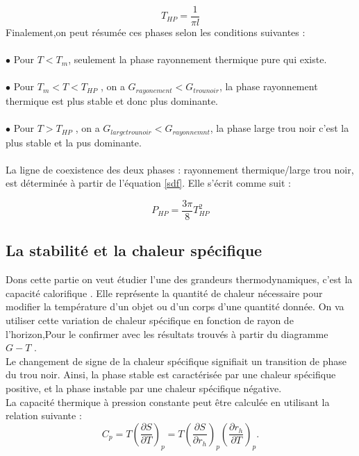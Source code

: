 \documentclass[12pt,  a4paper, openright]{report} %
\begin{document}
\begin{equation}
\label{sdf}
T_{HP}=\dfrac{1}{\pi l}
\end{equation}
Finalement,on peut résumée ces phases selon les conditions suivantes :\\
\\
$\bullet$  Pour $T < T_{m}$, seulement la phase rayonnement thermique pure qui existe.\\
\\
$\bullet$ Pour $ T_{m} < T < T_{HP}$ , on a $ G_{rayonement} < G_{trou noir}$, la phase rayonnement thermique est plus stable et donc plus dominante.\\
\\
$\bullet$ Pour $T > T_{HP}$ , on a $G_{large trou noir} < G_{rayonnemnt}$, la phase large trou noir c’est la plus stable et la pus dominante.\\
\\
La ligne de coexistence des deux phases : rayonnement thermique/large trou noir, est
déterminée à partir de l’équation \ref{sdf}. Elle s’écrit comme suit :

\begin{equation}
P_{HP}=\dfrac{3\pi}{8}T_{HP}^{2}
\end{equation}

\subsection{La stabilité et la chaleur spécifique}
Dons cette partie on veut étudier l'une des grandeurs thermodynamiques, c'est la capacité calorifique . Elle représente la quantité de chaleur nécessaire pour modifier la température d’un objet ou d'un corps d'une quantité donnée. On va utiliser cette variation de chaleur spécifique en fonction de rayon de l'horizon,Pour le confirmer avec les résultats trouvés à partir du diagramme $G-T$ .\\
Le changement de signe de la chaleur spécifique signifiait un transition de phase du trou noir. Ainsi, la phase stable est caractérisée par une chaleur spécifique positive, et la phase instable par une chaleur spécifique négative.\\
La capacité thermique à pression constante peut être calculée en utilisant la relation suivante :
\begin{equation}
\label{sq}
C_{p}=T(\dfrac{\partial S}{\partial T})_{p}=T(\dfrac{\partial S}{\partial r_{h}})_{p}(\dfrac{\partial r_{h}}{\partial T})_{p}.
\end{equation}
\end{document}
